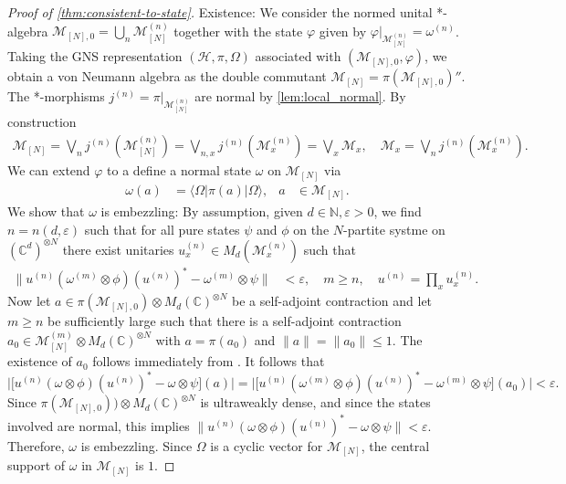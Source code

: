 \documentclass[a4paper, 10pt, onecolumn, accepted=2025-07-22]{quantumarticle}
\theoremstyle{definition}
\newcommand{\ket}[1]{|#1\rangle}
\newcommand{\bra}[1]{\langle#1|}
\newcommand{\norm}[1]{\lVert #1\rVert}
\newcommand{\ox}{\otimes}
\newcommand{\mc}{\mathcal}
\newcommand{\eps}{\varepsilon}
\def\CC{{\mathbb C}}
\def\H{{\mc H}}
\def\M{{\mc M}}
\def\NN{{\mathbb N}}
\newcommand*{\1}{\text{\usefont{U}{bbold}{m}{n}1}}
\begin{document}
\begin{proof}[Proof of \cref{thm:consistent-to-state}]
    Existence: We consider the normed unital *-algebra $\M_{[N],0} = \bigcup_{n}\M^{(n)}_{[N]}$ together with the state $\varphi$ given by $\varphi|_{\M^{(n)}_{[N]}} = \omega^{(n)}$. 
    Taking the GNS representation $(\H,\pi,\Omega)$ associated with $(\M_{[N],0},\varphi)$, we obtain a von Neumann algebra as the double commutant $\M_{[N]} = \pi(\M_{[N],0})''$.
    The *-morphisms $j^{(n)} = \pi|_{\M^{(n)}_{[N]}}$ are normal by \cref{lem:local_normal}. By construction 
    \begin{align}
    \M_{[N]}=\bigvee_n j^{(n)}(\M^{(n)}_{[N]}) = \bigvee_{n,x} j^{(n)}(\M^{(n)}_x) = \bigvee_x \M_x,\quad \M_x = \bigvee_n j^{(n)}(\M^{(n)}_x).
    \end{align}
    We can extend $\varphi$ to a define a normal state $\omega$ on $\M_{[N]}$ via
    \begin{align*}
        \omega(a) & = \bra{\Omega}\pi(a)\ket{\Omega}, &  a & \in\M_{[N]}.
    \end{align*}
    We show that $\omega$ is embezzling:
    By assumption, given $d\in\NN, \eps>0$, we find $n = n(d,\eps)$ such that for all pure states $\psi$ and $\phi$ on the $N$-partite systme on $(\CC^d)^{\ox N}$ there exist unitaries $u^{(n)}_x\in M_{d}(\M^{(n)}_x)$ such that
    \begin{align*}
        \norm{u^{(n)}(\omega^{(m)}\ox\phi)(u^{(n)})^{*}-\omega^{(m)}\ox\psi} & < \eps,\quad   m\geq n,\quad u^{(n)}=\prod_x u^{(n)}_x. 
    \end{align*}
    Now let $a\in \pi(\M_{[N],0})\ox M_d(\CC)^{\ox N}$ be a self-adjoint contraction and let $m\geq n$ be sufficiently large such that there is a self-adjoint contraction $a_0\in \M^{(m)}_{[N]}\ox M_d(\CC)^{\ox N}$ with $a=\pi(a_0)$ and $\norm{a}=\norm{a_0}\leq 1$. The existence of $a_0$ follows immediately from \cite[Prop.~II.5.1.5]{blackadar_operator_2006}.
    It follows that
    \begin{equation}
        \big|\big[ u^{(n)}(\omega \ox \phi)(u^{(n)})^* -\omega\ox\psi\big](a)\big|
        = \big|\big[u^{(n)}(\omega^{(m)}\ox \phi)(u^{(n)})^*-\omega^{(m)} \ox \psi \big](a_0)\big|< \eps.\nonumber
    \end{equation}
    Since $\pi(\M_{[N],0}))\ox M_d(\CC)^{\ox N}$ is ultraweakly dense, and since the states involved are normal, this implies $\norm{u^{(n)}(\omega \ox\phi)(u^{(n)})^*-\omega\ox\psi}<\eps$.
    Therefore, $\omega$ is embezzling.
    Since $\Omega$ is a cyclic vector for $\M_{[N]}$, the central support of $\omega$ in $\M_{[N]}$ is $1$.    
    

\end{proof}
\end{document}
